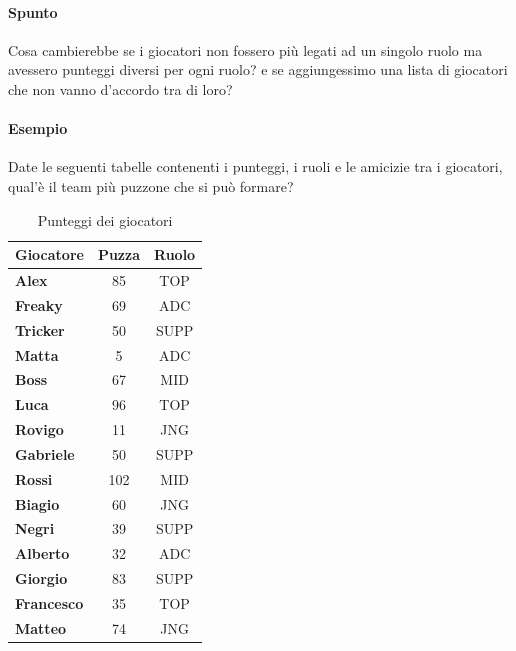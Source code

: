     \paragraph{Spunto} Cosa cambierebbe se i giocatori non fossero più legati ad un singolo ruolo ma avessero punteggi diversi per ogni ruolo? e se aggiungessimo una lista di giocatori che non vanno d'accordo tra di loro?
    \paragraph{Esempio} Date le seguenti tabelle contenenti i punteggi, i ruoli e le amicizie tra i giocatori, qual'è il team più puzzone che si può formare?

    \begin{table}[h!]
        \centering
        \caption{Punteggi dei giocatori}
        \label{tab:punteggi_giocatori}
        \begin{tabular}{|l|c|c|}
        \hline
            \textbf{Giocatore} & \textbf{Puzza} & \textbf{Ruolo} \\ \hline
            \textbf{Alex} & 85 & TOP \\ \hline
            \textbf{Freaky} & 69 & ADC \\ \hline
            \textbf{Tricker} & 50 & SUPP \\ \hline
            \textbf{Matta} & 5 & ADC \\ \hline
            \textbf{Boss} & 67 & MID \\ \hline
            \textbf{Luca} & 96 & TOP \\ \hline
            \textbf{Rovigo} & 11 & JNG \\ \hline
            \textbf{Gabriele} & 50 & SUPP \\ \hline
            \textbf{Rossi} & 102 & MID \\ \hline
            \textbf{Biagio} & 60 & JNG \\ \hline
            \textbf{Negri} & 39 & SUPP \\ \hline
            \textbf{Alberto} & 32 & ADC \\ \hline
            \textbf{Giorgio} & 83 & SUPP \\ \hline
            \textbf{Francesco} & 35 & TOP \\ \hline
            \textbf{Matteo} & 74 & JNG \\ \hline
        \end{tabular}
    \end{table}

